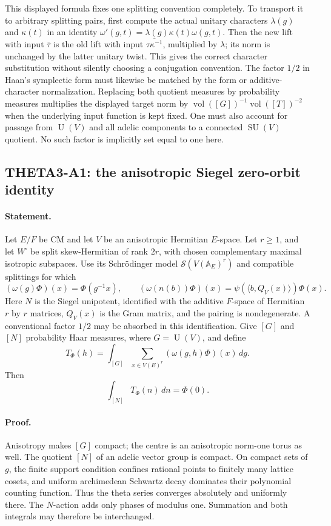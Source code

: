 \documentclass[11pt]{article}
\newcommand{\A}{\mathbb A}
\newcommand{\SU}{\operatorname{SU}}
\newcommand{\U}{\operatorname{U}}
\begin{document}
This displayed formula fixes one splitting convention completely.
To transport it to arbitrary splitting pairs, first compute the actual
unitary characters $\lambda(g)$ and $\kappa(t)$ in an identity
$\omega'(g,t)=\lambda(g)\kappa(t)\omega(g,t)$. Then the new lift with
input $\bar\tau$ is the old lift with input
$\overline{\tau\kappa^{-1}}$, multiplied by $\lambda$; its norm is
unchanged by the latter unitary twist. This gives the correct character
substitution without silently choosing a conjugation convention.
The factor $1/2$ in Haan's symplectic form must likewise be matched by
the form or additive-character normalization. Replacing both quotient
measures by probability measures multiplies the displayed target norm
by $\operatorname{vol}([G])^{-1}\operatorname{vol}([T])^{-2}$ when the
underlying input function is kept fixed. One must also account for
passage from $\U(V)$ and all adelic components to a connected
$\SU(V)$ quotient. No such factor is implicitly set equal to one here.

\subsection{THETA3-A1: the anisotropic Siegel zero-orbit identity}\label{A1}

\paragraph{Statement.}
Let $E/F$ be CM and let $V$ be an anisotropic Hermitian $E$-space.
Let $r\geq1$, and let $W^{\square}$ be split skew-Hermitian of rank
$2r$, with chosen complementary maximal isotropic subspaces. Use its
Schr\"odinger model $\mathcal S(V(\A_E)^r)$ and compatible splittings
for which
\[
 (\omega(g)\Phi)(x)=\Phi(g^{-1}x),\qquad
 (\omega(n(b))\Phi)(x)=\psi(\langle b,Q_V(x)\rangle)\Phi(x).
\]
Here $N$ is the Siegel unipotent, identified with the additive
$F$-space of Hermitian $r$ by $r$ matrices, $Q_V(x)$ is the Gram
matrix, and the pairing is nondegenerate. A conventional factor
$1/2$ may be absorbed in this identification. Give $[G]$ and $[N]$
probability Haar measures, where $G=\U(V)$, and define
\[
 T_\Phi(h)=\int_{[G]}\sum_{x\in V(E)^r}(\omega(g,h)\Phi)(x)\,dg.
\]
Then
\begin{equation}\label{A1-eq}
                    \int_{[N]}T_\Phi(n)\,dn=\Phi(0).
\end{equation}

\paragraph{Proof.}
Anisotropy makes $[G]$ compact; the centre is an anisotropic norm-one
torus as well. The quotient $[N]$ of an adelic vector group is compact.
On compact sets of $g$, the finite support condition confines rational
points to finitely many lattice cosets, and uniform archimedean
Schwartz decay dominates their polynomial counting function. Thus the
theta series converges absolutely and uniformly there. The $N$-action
adds only phases of modulus one. Summation and both integrals may
therefore be interchanged.
\end{document}
